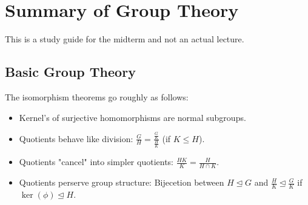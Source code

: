 \section{Summary of Group Theory}
This is a study guide for the midterm and not an actual lecture.
\subsection{Basic Group Theory}
\begin{theorem}
	The isomorphism theorems go roughly as follows:
\begin{itemize}
	\item Kernel's of surjective homomorphisms are normal subgroups.
	\item Quotients behave like division: \(\frac{G}{H} = \frac{\frac{G}{K}}{\frac{H}{K}}\) (if \(K \le H\)).
		\item Quotients "cancel" into simpler quotients: \(\frac{HK}{K} = \frac{H}{H\cap K}\).
			\item Quotients perserve group structure: Bijecetion between \(H \trianglelefteq G\) and \(\frac{H}{K}\trianglelefteq \frac{G}{K}\) if \(\ker \left( \phi \right) \trianglelefteq H\).
\end{itemize}
\end{theorem}

